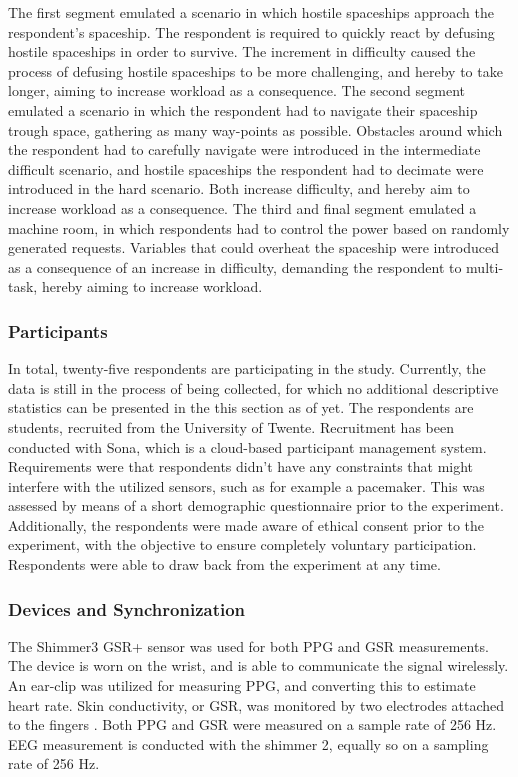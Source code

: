 \documentclass[12pt]{article}
\begin{document}
The first segment emulated a scenario in which hostile spaceships approach the respondent's spaceship. The respondent is required to  quickly react by defusing hostile spaceships in order to survive. The increment in difficulty caused the process of defusing hostile spaceships to be more challenging, and hereby to take longer,  aiming to increase workload as a consequence. The second segment emulated a scenario in which the respondent had to navigate their spaceship trough space, gathering as many way-points as possible. Obstacles around which the respondent had to carefully navigate were introduced in the intermediate difficult scenario, and hostile spaceships the respondent had to decimate were introduced in the hard scenario. Both increase difficulty, and hereby aim to increase workload as a consequence. The third and final segment emulated a machine room, in which respondents had to control the power based on randomly generated requests. Variables that could overheat the spaceship  were introduced as a consequence of an increase in difficulty, demanding the respondent to multi-task, hereby aiming to increase workload. 

\subsubsection{Participants}
In total, twenty-five respondents are participating in the study. Currently, the data is still in the process of being collected, for which no additional descriptive statistics can be presented in the this section as of yet. The respondents are students, recruited from the University of Twente. Recruitment has been conducted with Sona, which is a cloud-based participant management system. Requirements were that respondents didn't have any constraints that might interfere with the utilized sensors, such as for example a pacemaker. This was assessed by means of a short demographic questionnaire prior to the experiment. Additionally, the respondents were made aware of ethical consent prior to the experiment, with the objective to ensure completely voluntary participation. Respondents were able to draw back from the experiment at any time. 

\subsubsection{Devices and Synchronization}
The Shimmer3 GSR+ sensor was used for both PPG and GSR measurements. The device is worn on the wrist, and is able to communicate the signal wirelessly. An ear-clip was utilized for measuring PPG, and converting this to estimate heart rate. Skin conductivity, or GSR, was monitored by two electrodes attached to the fingers \cite{shimmer}. Both PPG and GSR were measured on a sample rate of 256 Hz. EEG measurement is conducted with the shimmer 2, equally so on a sampling rate of 256 Hz.
\end{document}

